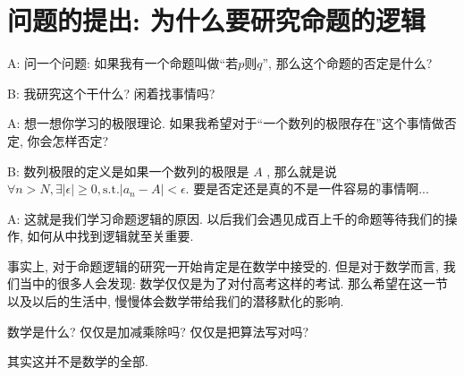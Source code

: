 \section{问题的提出: 为什么要研究命题的逻辑}

\begin{dialogue}
	A: 问一个问题: 如果我有一个命题叫做``若$p$则$q$'', 那么这个命题的否定是什么?
	
	B: 我研究这个干什么? 闲着找事情吗? 
	
	A: 想一想你学习的极限理论. 如果我希望对于``一个数列的极限存在''这个事情做否定, 你会怎样否定? 
	
	B: 数列极限的定义是如果一个数列的极限是 $A$ , 那么就是说$\forall n>N, \exists |\epsilon|\geq 0, \text{s.t.} |a_n-A|<\epsilon$. 要是否定还是真的不是一件容易的事情啊...
	
	A: 这就是我们学习命题逻辑的原因. 以后我们会遇见成百上千的命题等待我们的操作, 如何从中找到逻辑就至关重要. 
\end{dialogue}

事实上, 对于命题逻辑的研究一开始肯定是在数学中接受的. 但是对于数学而言, 我们当中的很多人会发现: 数学仅仅是为了对付高考这样的考试. 那么希望在这一节以及以后的生活中, 慢慢体会数学带给我们的潜移默化的影响. 

\begin{bonus}
	数学是什么? 仅仅是加减乘除吗? 仅仅是把算法写对吗? 
\end{bonus}

其实这并不是数学的全部. 